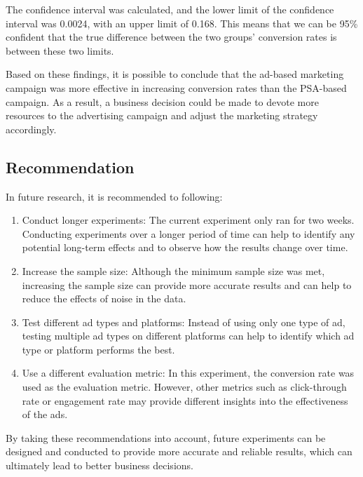 \documentclass{article}
\begin{document}
The confidence interval was calculated, and the lower limit of the confidence interval was 0.0024, with an upper limit of 0.168. This means that we can be 95\% confident that the true difference between the two groups' conversion rates is between these two limits.

Based on these findings, it is possible to conclude that the ad-based marketing campaign was more effective in increasing conversion rates than the PSA-based campaign. As a result, a business decision could be made to devote more resources to the advertising campaign and adjust the marketing strategy accordingly.

\subsection{Recommendation}

In future research, it is recommended to following:

\begin{enumerate}
    \item Conduct longer experiments: The current experiment only ran for two weeks. Conducting experiments over a longer period of time can help to identify any potential long-term effects and to observe how the results change over time.
    \item Increase the sample size: Although the minimum sample size was met, increasing the sample size can provide more accurate results and can help to reduce the effects of noise in the data.
    \item Test different ad types and platforms: Instead of using only one type of ad, testing multiple ad types on different platforms can help to identify which ad type or platform performs the best.
    \item Use a different evaluation metric: In this experiment, the conversion rate was used as the evaluation metric. However, other metrics such as click-through rate or engagement rate may provide different insights into the effectiveness of the ads.
\end{enumerate}

By taking these recommendations into account, future experiments can be designed and conducted to provide more accurate and reliable results, which can ultimately lead to better business decisions.

\printbibliography %
\end{document}
